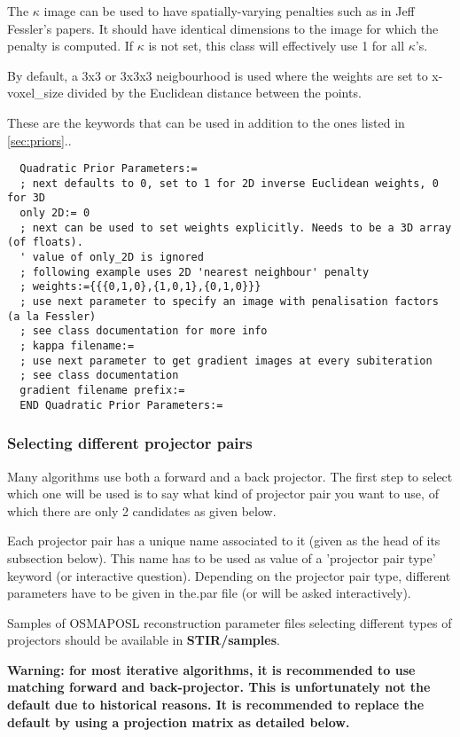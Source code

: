 \documentclass{article}
\begin{document}
  The $\kappa$ image can be used to have spatially-varying penalties such as in 
  Jeff Fessler's papers. It should have identical dimensions to the image for which the
  penalty is computed. If $\kappa$ is not set, this class will effectively
  use 1 for all $\kappa$'s.

  By default, a 3x3 or 3x3x3 neigbourhood is used where the weights are set to 
  x-voxel\_size divided by the Euclidean distance between the points.
 
{ 
}
  These are the keywords that can be used in addition to the ones listed in \ref{sec:priors}..
  \begin{verbatim}
  Quadratic Prior Parameters:=
  ; next defaults to 0, set to 1 for 2D inverse Euclidean weights, 0 for 3D 
  only 2D:= 0
  ; next can be used to set weights explicitly. Needs to be a 3D array (of floats).
  ' value of only_2D is ignored
  ; following example uses 2D 'nearest neighbour' penalty
  ; weights:={{{0,1,0},{1,0,1},{0,1,0}}}
  ; use next parameter to specify an image with penalisation factors (a la Fessler)
  ; see class documentation for more info
  ; kappa filename:=
  ; use next parameter to get gradient images at every subiteration
  ; see class documentation
  gradient filename prefix:= 
  END Quadratic Prior Parameters:=
  \end{verbatim}

\subsubsection{
Selecting different projector pairs}
\label{sec:projectorpairs}
Many algorithms use both a forward and a back projector. The 
first step to select which one will be used is to say what kind 
of projector pair you want to use, of which there are only 2 
candidates as given below. 


Each projector pair has a unique name associated to it (given 
as the head of its subsection below). This name has to be used 
as value of a 'projector pair type' keyword (or interactive question). 
Depending on the projector pair type, different parameters have 
to be given in the.par file (or will be asked interactively).


Samples of OSMAPOSL reconstruction parameter files selecting 
different types of projectors should be available in \textbf{STIR/samples}.

\textbf{Warning: for most iterative algorithms, it is recommended 
to use matching forward and back-projector. This is unfortunately 
not the default due to historical reasons. It is recommended to replace
the default by using a projection matrix as detailed below.}
\end{document}
